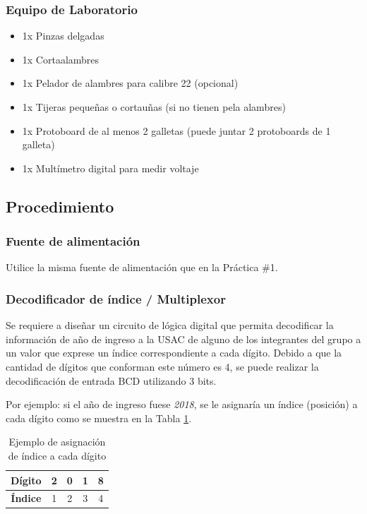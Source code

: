 \subsubsection*{Equipo de Laboratorio}
\begin{itemize}
    \item 1x Pinzas delgadas
    \item 1x Cortaalambres
    \item 1x Pelador de alambres para calibre 22 (opcional)
    \item 1x Tijeras pequeñas o cortauñas (si no tienen pela alambres)
    \item 1x Protoboard de al menos 2 galletas (puede juntar 2 protoboards de 1 galleta)
    \item 1x Multímetro digital para medir voltaje
\end{itemize}

\subsection{Procedimiento}
\subsubsection{Fuente de alimentación}
Utilice la misma fuente de alimentación que en la Práctica \#1.

\subsubsection{Decodificador de índice / Multiplexor}
Se requiere a diseñar un circuito de lógica digital que permita decodificar la información de año de ingreso a la USAC de alguno de los
integrantes del grupo a un valor que exprese un índice correspondiente a cada dígito. Debido a que la cantidad de dígitos
que conforman este número es 4, se puede realizar la decodificación de entrada BCD utilizando 3 bits.

\vspace{14pt}

Por ejemplo: si el año de ingreso fuese \emph{2018}, se le asignaría un índice (posición) a cada dígito como se
muestra en la Tabla \ref{Table:ejemploIndices}.

\begin{table}[H]
    \centering
    \begin{tabular}{|c|c|c|c|c|}
        \hline
        \textbf{Dígito} & 2 & 0 & 1 & 8 \\ \hline
        \textbf{Índice}  & 1 & 2 & 3 & 4 \\ \hline
    \end{tabular}
    \caption{Ejemplo de asignación de índice a cada dígito}
    \label{Table:ejemploIndices}
\end{table}


